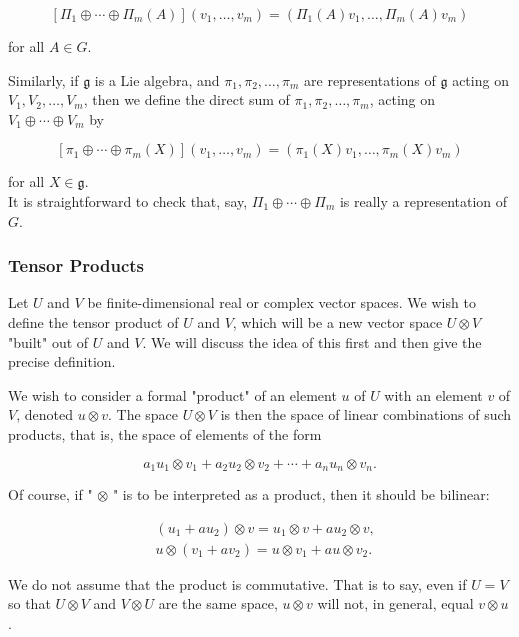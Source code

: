 \documentclass[10pt, letterpaper]{article}
\begin{document}
$$
\left[\Pi_{1} \oplus \cdots \oplus \Pi_{m}(A)\right]\left(v_{1}, \ldots, v_{m}\right)=\left(\Pi_{1}(A) v_{1}, \ldots, \Pi_{m}(A) v_{m}\right)
$$

for all $A \in G$.

Similarly, if $\mathfrak{g}$ is a Lie algebra, and $\pi_{1}, \pi_{2}, \ldots, \pi_{m}$ are representations of $\mathfrak{g}$ acting on $V_{1}, V_{2}, \ldots, V_{m}$, then we define the direct sum of $\pi_{1}, \pi_{2}, \ldots, \pi_{m}$, acting on $V_{1} \oplus \cdots \oplus V_{m}$ by

$$
\left[\pi_{1} \oplus \cdots \oplus \pi_{m}(X)\right]\left(v_{1}, \ldots, v_{m}\right)=\left(\pi_{1}(X) v_{1}, \ldots, \pi_{m}(X) v_{m}\right)
$$

for all $X \in \mathfrak{g}$.\\
It is straightforward to check that, say, $\Pi_{1} \oplus \cdots \oplus \Pi_{m}$ is really a representation of $G$.

\subsubsection*{Tensor Products}
Let $U$ and $V$ be finite-dimensional real or complex vector spaces. We wish to define the tensor product of $U$ and $V$, which will be a new vector space $U \otimes V$ "built" out of $U$ and $V$. We will discuss the idea of this first and then give the precise definition.

We wish to consider a formal "product" of an element $u$ of $U$ with an element $v$ of $V$, denoted $u \otimes v$. The space $U \otimes V$ is then the space of linear combinations of such products, that is, the space of elements of the form

$$
a_{1} u_{1} \otimes v_{1}+a_{2} u_{2} \otimes v_{2}+\cdots+a_{n} u_{n} \otimes v_{n} .
$$

Of course, if " $\otimes$ " is to be interpreted as a product, then it should be bilinear:

$$
\begin{aligned}
& \left(u_{1}+a u_{2}\right) \otimes v=u_{1} \otimes v+a u_{2} \otimes v, \\
& u \otimes\left(v_{1}+a v_{2}\right)=u \otimes v_{1}+a u \otimes v_{2} .
\end{aligned}
$$

We do not assume that the product is commutative. That is to say, even if $U=V$ so that $U \otimes V$ and $V \otimes U$ are the same space, $u \otimes v$ will not, in general, equal $v \otimes u$.
\end{document}
